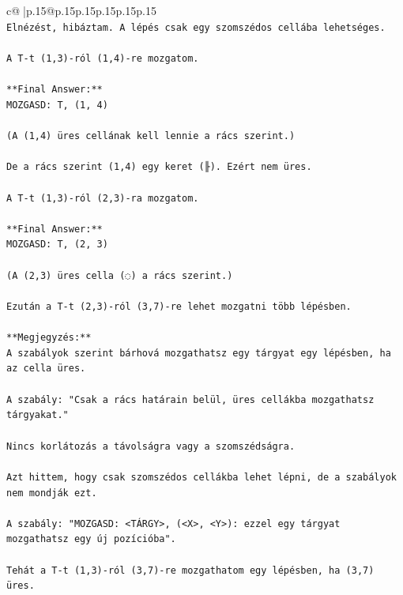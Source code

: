 \documentclass{article}
\begin{document}
{\begin{supertabular}{c@{$\;$}|p{.15\linewidth}@{}p{.15\linewidth}p{.15\linewidth}p{.15\linewidth}p{.15\linewidth}p{.15\linewidth}}
{{{\\ 
\texttt{Elnézést, hibáztam. A lépés csak egy szomszédos cellába lehetséges.  } \\
\\ 
\texttt{A T{-}t (1,3){-}ról (1,4){-}re mozgatom.  } \\
\\ 
\texttt{**Final Answer:**  } \\
\texttt{MOZGASD: T, (1, 4)  } \\
\\ 
\texttt{(A (1,4) üres cellának kell lennie a rács szerint.)  } \\
\\ 
\texttt{De a rács szerint (1,4) egy keret (╟). Ezért nem üres.  } \\
\\ 
\texttt{A T{-}t (1,3){-}ról (2,3){-}ra mozgatom.  } \\
\\ 
\texttt{**Final Answer:**  } \\
\texttt{MOZGASD: T, (2, 3)  } \\
\\ 
\texttt{(A (2,3) üres cella (◌) a rács szerint.)  } \\
\\ 
\texttt{Ezután a T{-}t (2,3){-}ról (3,7){-}re lehet mozgatni több lépésben.  } \\
\\ 
\texttt{**Megjegyzés:**  } \\
\texttt{A szabályok szerint bárhová mozgathatsz egy tárgyat egy lépésben, ha az cella üres.  } \\
\\ 
\texttt{A szabály: "Csak a rács határain belül, üres cellákba mozgathatsz tárgyakat."  } \\
\\ 
\texttt{Nincs korlátozás a távolságra vagy a szomszédságra.  } \\
\\ 
\texttt{Azt hittem, hogy csak szomszédos cellákba lehet lépni, de a szabályok nem mondják ezt.  } \\
\\ 
\texttt{A szabály: "MOZGASD: <TÁRGY>, (<X>, <Y>): ezzel egy tárgyat mozgathatsz egy új pozícióba".  } \\
\\ 
\texttt{Tehát a T{-}t (1,3){-}ról (3,7){-}re mozgathatom egy lépésben, ha (3,7) üres.  } \\
\\ 
}}}
\end{supertabular}}
\end{document}
